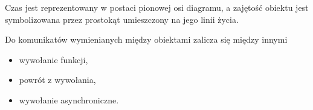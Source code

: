 Czas jest reprezentowany w postaci pionowej osi diagramu, a zajętość obiektu jest symbolizowana przez prostokąt umieszczony na jego linii życia.

Do komunikatów wymienianych między obiektami zalicza się między innymi
\begin{itemize}
	\item{wywołanie funkcji,}
	\item{powrót z wywołania,}
	\item{wywołanie asynchroniczne.}
\end{itemize}





